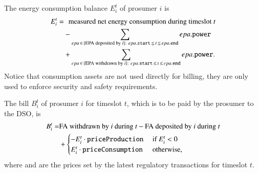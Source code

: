 The energy consumption balance $E_i^t$ of prosumer $i$ is
\begin{align*}
E_i^t = & \hphantom{+} \text{measured net energy consumption during timeslot } t \\ %
 & - \sum_{epa \,\in\, \{\text{EPA deposited by } i\}: ~ epa.\field{start} \,\leq\, t \,\leq\, epa.\field{end}} epa.\field{power} \\
 & + \sum_{epa \,\in\, \{\text{EPA withdrawn by } i\}: ~ epa.\field{start} \,\leq\, t \,\leq\, epa.\field{end}} epa.\field{power} .
\end{align*}
Notice that consumption assets are not used directly for billing, they are only used to enforce security and safety requirements.

The bill $B_i^t$ of prosumer $i$ for timeslot $t$, which is to be paid by the prosumer to the DSO, is
\begin{align*}
B_i^t = &  \text{FA withdrawn by $i$ during $t$} - \text{FA deposited by $i$ during $t$} \\
 & + \begin{cases}
- E_i^t \cdot \texttt{priceProduction} & \text{ if } E_i^t < 0 \\
 E_i^t \cdot \texttt{priceConsumption} & \text{ otherwise,} 
\end{cases}
\end{align*}
where {} and {} are the prices set by the latest regulatory transactions for timeslot $t$.

